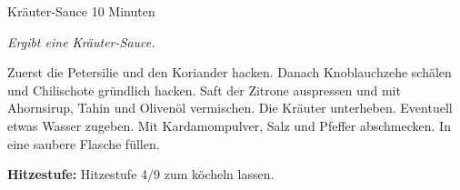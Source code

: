 \begin{recipe}{Kräuter-Sauce} {} {10 Minuten}

  \freeform
  \textit{Ergibt eine Kräuter-Sauce.}


  Zuerst die Petersilie und den Koriander hacken.
  Danach Knoblauchzehe schälen und Chilischote gründlich hacken.
  Saft der Zitrone auspressen und mit Ahornsirup, Tahin und Olivenöl vermischen.
  Die Kräuter unterheben.
  Eventuell etwas Wasser zugeben.
  Mit Kardamompulver, Salz und Pfeffer abschmecken.
  In eine saubere Flasche füllen.

  \freeform
  \hrulefill

  \freeform
  \textbf{Hitzestufe:}
  Hitzestufe 4/9 zum köcheln lassen.

  \end{recipe}
